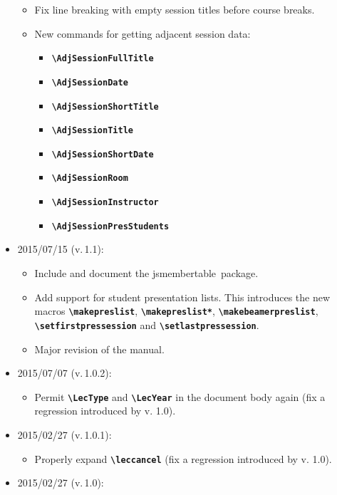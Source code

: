 \documentclass[english]{article}
\newcommand*\jmacro[1]{\textbf{\texttt{#1}}}
\newcommand*\jcsmacro[1]{\jmacro{\textbackslash{#1}}}
\newcommand*\jsmt{\textsf{jsmembertable}}
\begin{document}
\begin{itemize}
    \begin{itemize}	
	\item Fix line breaking with empty session titles before course breaks. 
	\item New commands for getting adjacent session data:
	   \begin{itemize}	
		  \item \jcsmacro{AdjSessionFullTitle}
		  \item \jcsmacro{AdjSessionDate}
		  \item \jcsmacro{AdjSessionShortTitle}
		  \item \jcsmacro{AdjSessionTitle}
		  \item \jcsmacro{AdjSessionShortDate}
		  \item \jcsmacro{AdjSessionRoom}
		  \item \jcsmacro{AdjSessionInstructor}\enlargethispage{\baselineskip}
		  \item \jcsmacro{AdjSessionPresStudents}
	  \end{itemize}
    \end{itemize}
\item 2015/07/15 (v.\,1.1):
     \begin{itemize}
       \item Include and document the \jsmt\ package.
       \item Add support for student presentation lists. This introduces the new macros
             \jcsmacro{makepreslist}, \jcsmacro{makepreslist*},
             \jcsmacro{makebeamerpreslist}, \jcsmacro{setfirstpressession} and
             \jcsmacro{setlastpressession}.
       \item Major revision of the manual.
     \end{itemize}
\item 2015/07/07 (v.\,1.0.2):
     \begin{itemize}
       \item Permit \jcsmacro{LecType} and \jcsmacro{LecYear} in the document body again
             (fix a regression introduced by v. 1.0).
     \end{itemize}
\item 2015/02/27 (v.\,1.0.1):
     \begin{itemize}
       \item Properly expand \jcsmacro{leccancel}
             (fix a regression introduced by v. 1.0).
     \end{itemize}
\item 2015/02/27 (v.\,1.0):
     \begin{itemize}

\end{itemize}
\end{itemize}
\end{document}
